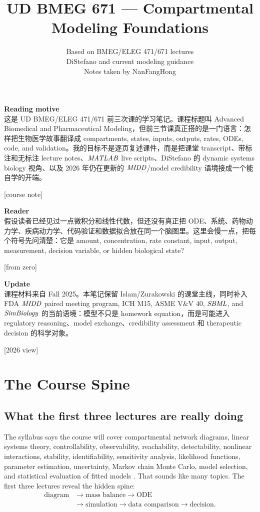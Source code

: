\documentclass[a4paper]{article}
\title{UD BMEG 671 --- Compartmental\\ Modeling Foundations}
\author{Based on BMEG/ELEG 471/671 lectures\\\small DiStefano and current modeling guidance\\\small Notes taken by NanFangHong}
\newcommand{\MIDD}{\ensuremath{\pksym{MIDD}}}
\newcommand{\SBML}{\ensuremath{\pksym{SBML}}}
\newcommand{\MATLAB}{\ensuremath{\pksym{MATLAB}}}
\newcommand{\SimBio}{\ensuremath{\pksym{SimBiology}}}
\begin{document}
\maketitle
{\small
  \noindent\textbf{Reading motive}\\
  这是 UD BMEG/ELEG 471/671 前三次课的学习笔记。课程标题叫 Advanced Biomedical and Pharmaceutical Modeling，但前三节课真正搭的是一门语言：怎样把生物医学故事翻译成 compartments, states, inputs, outputs, rates, ODEs, code, and validation。我的目标不是逐页复述课件，而是把课堂 transcript、带标注和无标注 lecture notes、\MATLAB{} live scripts、DiStefano 的 dynamic systems biology 视角、以及 2026 年仍在更新的 \MIDD{}/model credibility 语境接成一个能自学的开端。\par\hfill[course note]

  \vspace{5pt}
  \noindent\textbf{Reader}\\
  假设读者已经见过一点微积分和线性代数，但还没有真正把 ODE、系统、药物动力学、疾病动力学、代码验证和数据拟合放在同一个脑图里。这里会慢一点，把每个符号先问清楚：它是 amount, concentration, rate constant, input, output, measurement, decision variable, or hidden biological state?\par\hfill[from zero]

  \vspace{5pt}
  \noindent\textbf{Update}\\
  课程材料来自 Fall 2025。本笔记保留 Islam/Zurakowski 的课堂主线，同时补入 FDA \MIDD{} paired meeting program, ICH M15, ASME V\&V 40, \SBML{}, and \SimBio{} 的当前语境：模型不只是 homework equation，而是可能进入 regulatory reasoning、model exchange、credibility assessment 和 therapeutic decision 的科学对象。\par\hfill[2026 view]
}

\tableofcontents

\section{The Course Spine}

\subsection{What the first three lectures are really doing}

The syllabus says the course will cover compartmental network diagrams, linear systems theory, controllability, observability, reachability, detectability, nonlinear interactions, stability, identifiability, sensitivity analysis, likelihood functions, parameter estimation, uncertainty, Markov chain Monte Carlo, model selection, and statistical evaluation of fitted models \cite{bmeg671Syllabus2025}. That sounds like many topics. The first three lectures reveal the hidden spine:
\[
  \begin{aligned}
  \text{diagram}
  &\longrightarrow
  \text{mass balance}
  \longrightarrow
  \text{ODE}\\
  &\longrightarrow
  \text{simulation}
  \longrightarrow
  \text{data comparison}
  \longrightarrow
  \text{decision}.
  \end{aligned}
\]
\end{document}
